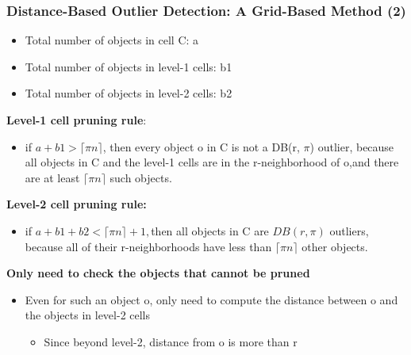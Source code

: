 \documentclass[aspectratio=169,t,xcolor=dvipsnames]{beamer}
\begin{document}
\begin{frame}
	\frametitle{Distance-Based Outlier Detection: A Grid-Based Method (2)}
	\begin{itemize}
		\item Total number of objects in cell C: \alert{a}
		\item Total number of objects in level-1 cells: \alert{b1}
		\item Total number of objects in level-2 cells: \alert{b2}
	\end{itemize}
	\textbf{Level-1 cell pruning rule}:
	\begin{itemize}
		\item if $a + b1 > \lceil \pi n \rceil$, then every object o in C is not a DB(r, $\pi$) outlier, because all objects in C and the level-1 cells are in the r-neighborhood of o,and there are at least $\lceil \pi n \rceil$ such objects.
	\end{itemize}
	 \textbf{Level-2 cell pruning rule:}
	\begin{itemize}
		\item if $ a + b1 + b2 < \lceil \pi n \rceil + 1,$then all objects in C are $DB(r, \pi)$  outliers, because all of their r-neighborhoods have less than $\lceil \pi n\rceil$ other objects.
	\end{itemize}
	\textbf{Only need to check the objects that cannot be pruned}
	\begin{itemize}
		\item Even for such an object o, only need to compute the distance between o and the objects in level-2 cells
		      \begin{itemize}
		      	\item Since beyond level-2, distance from o is more than r
		      \end{itemize}
	\end{itemize}
\end{frame}
\end{document}
